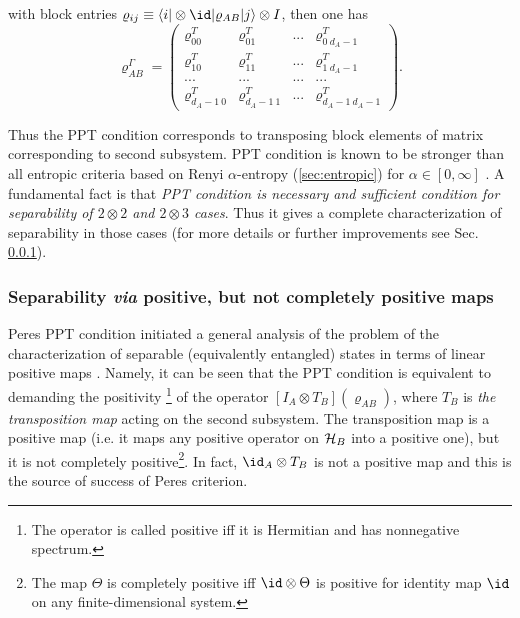 \documentclass[rmp,12pt,preprint]{revtex4-2}
\begin{document}
with block entries $\varrho_{ij} \equiv \langle i |\otimes \id |
\varrho_{AB} | j \rangle \otimes I$, then one has
\begin{equation}
\varrho_{AB}^{\Gamma}=\left(\begin{array}{cccc}
\varrho_{00}^{T} & \varrho_{01}^{T} & ... & \varrho_{0 \ d_{A}-1}^{T}\\
\varrho_{10}^{T} & \varrho_{11}^{T} & ... & \varrho_{1 \ d_{A}-1}^{T}\\
 ...  &  ...  & ...   & ...  \\
\varrho_{d_{A}-1 \ 0}^{T} & \varrho_{d_{A}-1 \ 1}^{T} & ... &
\varrho_{d_{A}-1  \ d_{A}-1}^{T}
\end{array} \right).
\end{equation}

Thus the PPT condition corresponds to transposing block elements of
matrix corresponding to second subsystem. PPT condition is known to be
stronger than all entropic criteria based on Renyi $\alpha$-entropy
(\ref{sec:entropic}) for $\alpha \in [0,\infty]$ \cite{VollbrechtW}. A
fundamental fact is \cite{Peres96,sep1996} that {\it PPT condition is
  necessary and sufficient condition for separability of $2 \otimes 2$
  and $2 \otimes 3$ cases}. Thus it gives a complete characterization
of separability in those cases (for more details or further
improvements see Sec.  \ref{subsubsec:maps}).


\subsubsection{Separability {\it via} positive, but not completely positive maps}
\label{subsubsec:maps}

Peres PPT condition initiated a general analysis of the problem of the
characterization of separable (equivalently entangled) states in terms
of linear positive maps \cite{sep1996}. Namely, it can be seen that
the PPT condition is equivalent to demanding the positivity
\footnote{The operator is called positive iff it is Hermitian and has
  nonnegative spectrum.} of the operator $[I_{A} \otimes
T_{B}](\varrho_{AB})$, where $T_{B}$ is {\it the transposition map}
acting on the second subsystem. The transposition map is a positive
map (i.e. it maps any positive operator on ${\cal H}_{B}$ into a
positive one), but it is not completely positive\footnote{The map
  $\Theta$ is completely positive iff $\id \otimes \Theta$ is positive
  for identity map $\id$ on any finite-dimensional system.}. In fact,
$\id_{A} \otimes T_{B}$ is not a positive map and this is the source
of success of Peres criterion.
\end{document}
